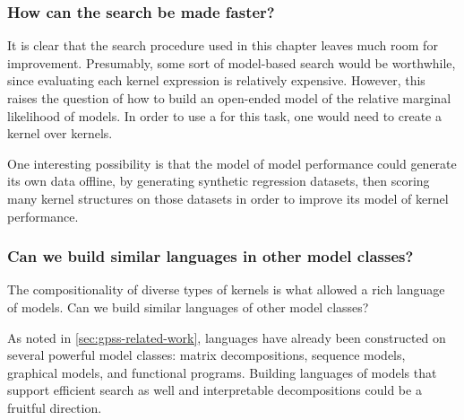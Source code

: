 \subsubsection{How can the search be made faster?}
It is clear that the search procedure used in this chapter leaves much room for improvement.
Presumably, some sort of model-based search would be worthwhile, since evaluating each kernel expression is relatively expensive.
However, this raises the question of how to build an open-ended model of the relative marginal likelihood of \gp{} models.
In order to use a \gp{} for this task, one would need to create a kernel over kernels.

One interesting possibility is that the model of model performance could generate its own data offline, by generating synthetic regression datasets, then scoring many kernel structures on those datasets in order to improve its model of kernel performance.

\subsubsection{Can we build similar languages in other model classes?}
The compositionality of diverse types of kernels is what allowed a rich language of \gp{} models.
Can we build similar languages of other model classes?

As noted in \cref{sec:gpss-related-work}, languages have already been constructed on several powerful model classes: matrix decompositions, sequence models, graphical models, and functional programs.
Building languages of models that support efficient search as well and interpretable decompositions could be a fruitful direction.
\fi

\outbpdocument{


}





\iffalse


